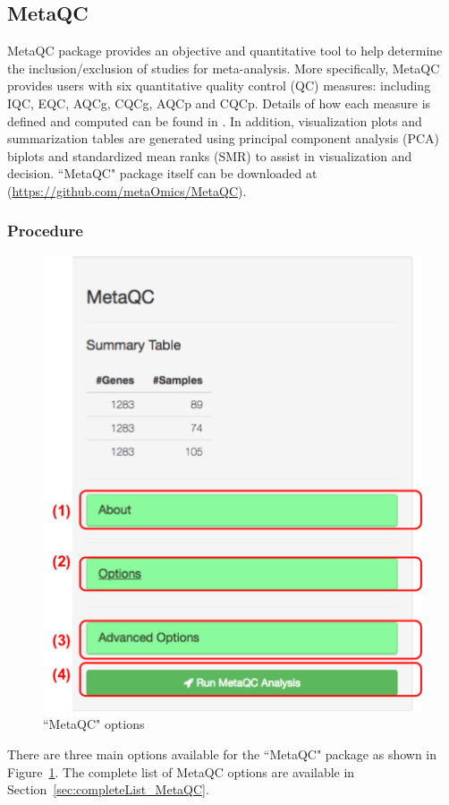 \subsection{MetaQC}
MetaQC package provides an objective and quantitative tool to help determine the inclusion/exclusion of studies for meta-analysis. More specifically, MetaQC provides users with six quantitative quality control (QC) measures: including IQC, EQC, AQCg, CQCg, AQCp and CQCp. Details of how each measure is defined and computed can be found in \cite{kang2012metaqc}. In addition, visualization plots and summarization tables are generated using principal component analysis (PCA) biplots and standardized mean ranks (SMR) to assist in visualization and decision. 
``MetaQC" package itself can be downloaded at (\url{https://github.com/metaOmics/MetaQC}). 
\subsubsection{Procedure}

\begin{figure}[H]
\begin{center}
\includegraphics[scale=0.5]{./figure/metaQC/metaQCoption.pdf}
\caption{``MetaQC" options}
\label{fig:MetaQCoption}
\end{center}
\end{figure}
There are three main options available for the ``MetaQC" package as shown in Figure~\ref{fig:MetaQCoption}. 
The complete list of MetaQC options are available in Section~\ref{sec:completeList_MetaQC}.

